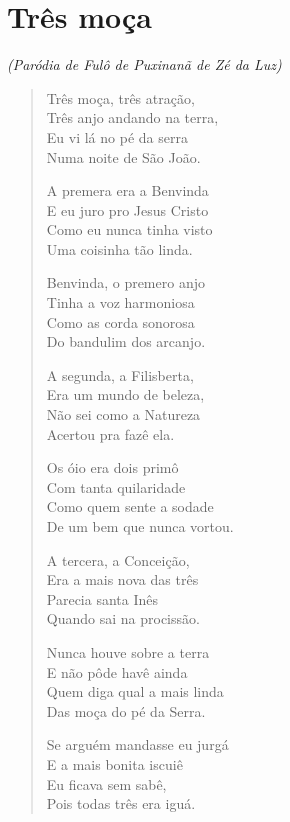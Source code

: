 \chapter{Três moça}

\begin{flushright}
\emph{(Paródia de Fulô de Puxinanã de Zé da Luz)}
\end{flushright}

\begin{verse}
Três moça, três atração,\\
Três anjo andando na terra,\\
Eu vi lá no pé da serra\\
Numa noite de São João.

A premera era a Benvinda\\
E eu juro pro Jesus Cristo\\
Como eu nunca tinha visto\\
Uma coisinha tão linda.

Benvinda, o premero anjo\\
Tinha a voz harmoniosa\\
Como as corda sonorosa\\
Do bandulim dos arcanjo.

A segunda, a Filisberta,\\
Era um mundo de beleza,\\
Não sei como a Natureza\\
Acertou pra fazê ela.

Os óio era dois primô\\
Com tanta quilaridade\\
Como quem sente a sodade\\
De um bem que nunca vortou.

A tercera, a Conceição,\\
Era a mais nova das três\\
Parecia santa Inês\\
Quando sai na procissão.

Nunca houve sobre a terra\\
E não pôde havê ainda\\
Quem diga qual a mais linda\\
Das moça do pé da Serra.

Se arguém mandasse eu jurgá\\
E a mais bonita iscuiê\\
Eu ficava sem sabê,\\
Pois todas três era iguá.


\end{verse}
